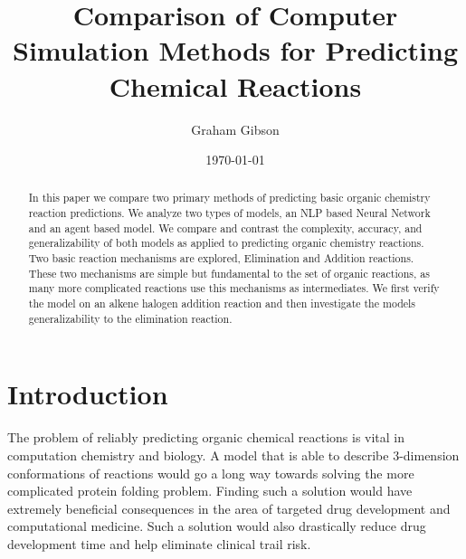 \documentclass[aps,floatfix,prd,showpacs]{revtex4}
\begin{document}
\title{Comparison of Computer Simulation Methods for Predicting Chemical Reactions}
\author{Graham Gibson}

\date{\today}

\begin{abstract}

In this paper we compare two primary methods of predicting basic organic chemistry reaction predictions. We analyze two types of models, an NLP based Neural Network and an agent based model. We compare and contrast the complexity, accuracy, and generalizability of both models as applied to predicting organic chemistry reactions. Two basic reaction mechanisms are explored, Elimination and Addition reactions.  These two mechanisms are simple but fundamental to the set of organic reactions, as many more complicated reactions use this mechanisms as intermediates.  We first verify the model on an alkene halogen addition reaction and then investigate the models generalizability to the elimination reaction. 


\end{abstract}
	\maketitle

\section{Introduction}

The problem of reliably predicting organic chemical reactions is vital in computation chemistry and biology. A model that is able to describe 3-dimension conformations of reactions would go a long way towards solving the more complicated protein folding problem. Finding such a solution would have extremely beneficial consequences in the area of targeted drug development and computational medicine. Such a solution would also drastically reduce drug development time and help eliminate clinical trail risk.
\end{document}
